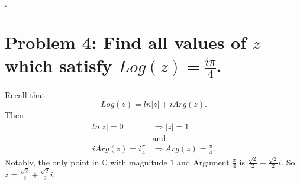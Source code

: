 \documentclass[12 pt]{article}        	%
\newcommand{\qed}[0]{$\square$}
\newcommand{\complex}{\mathbb C}
\begin{document}
\hfill\qed


\section*{Problem 4: Find all values of $z$ which satisfy $Log(z) = \frac{i\pi}{4}$.}
Recall that 
\begin{equation}
    Log(z) = ln|z|+iArg(z).
\end{equation}
Then
\begin{align}
    ln|z| = 0 &\Rightarrow |z| = 1\\
    &\text{and}\\
    iArg(z) = i\frac{\pi}{4} &\Rightarrow Arg(z) = \frac{\pi}{4}.
\end{align}
Notably, the only point in $\complex$ with magnitude $1$ and Argument $\frac{\pi}{4}$ is $\frac{\sqrt{2}}{2}+\frac{\sqrt{2}}{2}i$. So $z = \frac{\sqrt{2}}{2}+\frac{\sqrt{2}}{2}i$.
\end{document}
